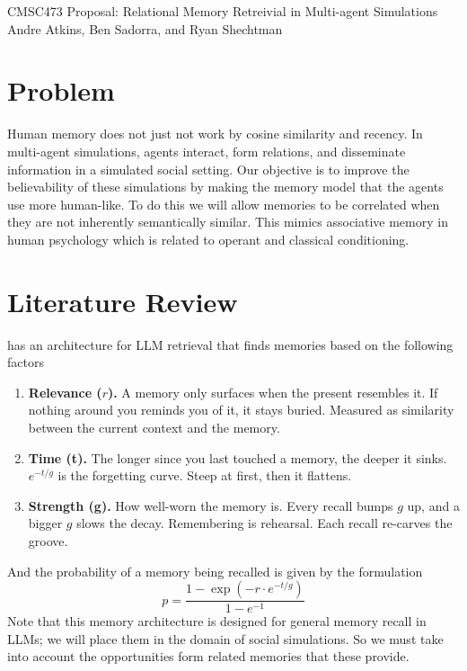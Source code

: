 \documentclass{article}
\begin{document}
\begin{center}
    {\Large CMSC473 Proposal: Relational Memory Retreivial in Multi-agent Simulations} \\
    Andre Atkins, Ben Sadorra, and Ryan Shechtman
\end{center}

\section{Problem}
Human memory does not just not work by cosine similarity and recency.
In multi-agent simulations, agents interact, form relations, and disseminate information in a simulated social setting.
Our objective is to improve the believability of these simulations by making the memory model that the agents use more human-like.
To do this we will allow memories to be correlated when they are not inherently semantically similar. This mimics associative memory in human psychology which is related to operant and classical conditioning.

\section{Literature Review}
\textcite{hou2024humanrecall} has an architecture for LLM retrieval that finds memories based on the following factors
\begin{enumerate}
    \item \textbf{Relevance ($r$).}
        A memory only surfaces when the present resembles it. If nothing around you reminds you of it, it stays buried. Measured as similarity between the current context and the memory.
    \item \textbf{Time (t).}
        The longer since you last touched a memory, the deeper it sinks. $e^{−t/g}$ is the forgetting curve. Steep at first, then it flattens.
    \item \textbf{Strength (g).}
        How well-worn the memory is. Every recall bumps $g$ up, and a bigger $g$ slows the decay. Remembering is rehearsal. Each recall re-carves the groove.
\end{enumerate}
And the probability of a memory being recalled is given by the formulation
$$ p = \frac{1 - \exp\left(−r \cdot e^{−t/g}\right)}{1 − e^{−1}} $$
Note that this memory architecture is designed for general memory recall in LLMs; we will place them in the domain of social simulations. So we must take into account the opportunities form related memories that these provide.
\end{document}
